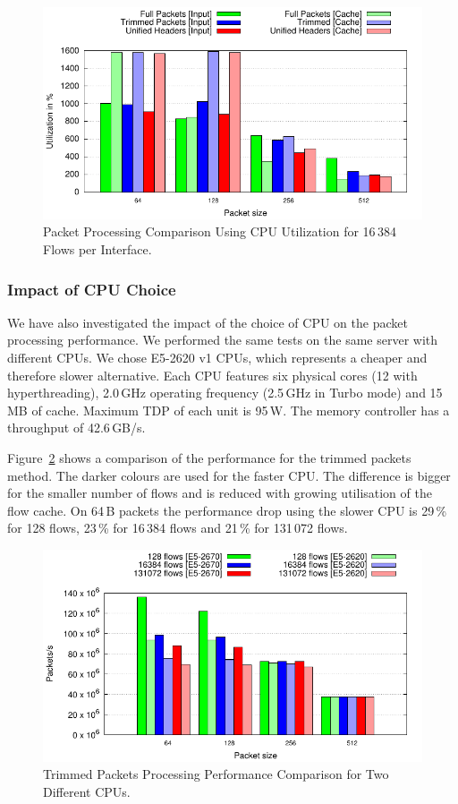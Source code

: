 \begin{figure}[!htb]
    \centering 
    \includegraphics{figures/paper-highdensity/graphs/cpu-all.pdf}
    \caption{Packet Processing Comparison Using CPU Utilization for 16\,384 Flows per Interface.}
    \label{fig:cpu-all}
\end{figure}

\subsubsection{Impact of CPU Choice}

We have also investigated the impact of the choice of CPU on the packet processing performance. We performed the same tests on the same server with different CPUs. We chose E5-2620 v1 CPUs, which represents a cheaper and therefore slower alternative. Each CPU features six physical cores (12 with hyperthreading), 2.0\,GHz operating frequency (2.5\,GHz in Turbo mode) and 15\,MB of cache. Maximum TDP of each unit is 95\,W. The memory controller has a throughput of 42.6\,GB/s.

Figure~\ref{fig:packet-trim-comparison} shows a comparison of the performance for the trimmed packets method. The darker colours are used for the faster CPU. The difference is bigger for the smaller number of flows and is reduced with growing utilisation of the flow cache. On 64\,B packets the performance drop using the slower CPU is 29\,\% for 128 flows, 23\,\% for 16\,384 flows and 21\,\% for 131\,072 flows. 

\begin{figure}[!htb]
    \centering 
    \includegraphics{figures/paper-highdensity/graphs/packets-trim-comparison.pdf}
    \caption{Trimmed Packets Processing Performance Comparison for Two Different CPUs.}
    \label{fig:packet-trim-comparison}
\end{figure}

